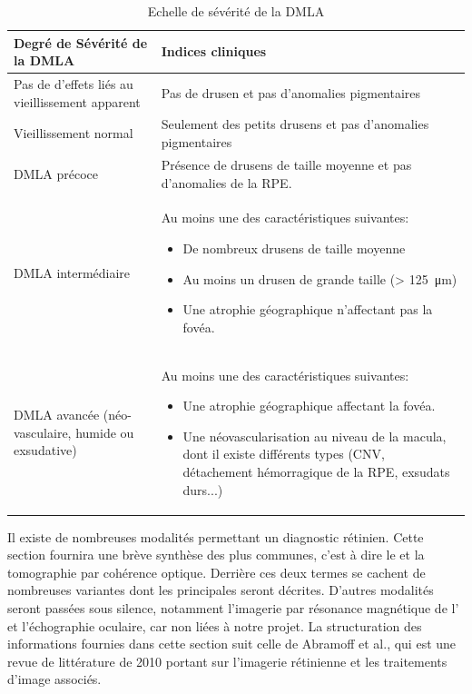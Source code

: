 \begin{table}[!ht]
	\centering
	\caption{Echelle de sévérité de la \ac{DMLA}}
	\label{tab:DMLA}
	\begin{tabular}{p{}p{}} 
		\toprule
		Degré de Sévérité  de la \ac{DMLA} & Indices cliniques\\ 
		\toprule
		\rowcolor[gray]{0.95} Pas de d'effets liés au vieillissement apparent & Pas de drusen et pas d'anomalies pigmentaires\\ 
		Vieillissement normal & Seulement des petits drusens et pas d'anomalies pigmentaires \\
		\rowcolor[gray]{0.95} \ac{DMLA} précoce & Présence de drusens de taille moyenne et pas d'anomalies de la \ac{RPE}. \\
		\ac{DMLA} intermédiaire & Au moins une des caractéristiques suivantes:
		\begin{itemize}
			\item De nombreux drusens de taille moyenne
			\item Au moins un drusen de grande taille (> \SI{125}{\micro\meter})
			\item Une atrophie géographique n'affectant pas la fovéa.
		\end{itemize}
		\\ 
		\rowcolor[gray]{0.95}\ac{DMLA} avancée (néo-vasculaire, humide ou exsudative) & Au moins une des caractéristiques suivantes:
		\begin{itemize}
			\item Une atrophie géographique affectant la fovéa.
			\item Une néovascularisation au niveau de la macula, dont il existe différents types (\ac{CNV}, détachement hémorragique de la \ac{RPE}, exsudats durs...)  
		\end{itemize}
		\\
		\bottomrule
	\end{tabular}
	
\end{table}

\label{sec:ImagerieRetina}
Il existe de nombreuses modalités permettant un diagnostic rétinien. Cette section fournira une brève synthèse des plus communes, c'est à dire le \fundus{} et la tomographie par cohérence optique. Derrière ces deux termes se cachent de nombreuses variantes dont les principales seront décrites. D'autres modalités seront passées sous silence, notamment l'imagerie par résonance magnétique de l'\oeil{} et l'échographie oculaire, car non liées à notre projet.
La structuration des informations fournies dans cette section suit celle de Abramoff et al.\cite{abramoffRetinalImagingImage2010a}, qui est une revue de littérature de 2010 portant sur l'imagerie rétinienne et les traitements d'image associés. 
